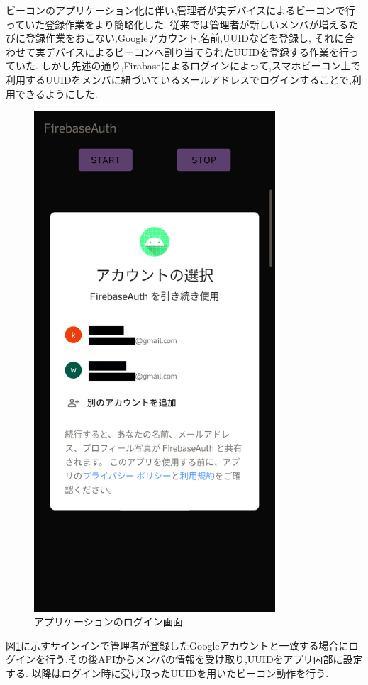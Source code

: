 ビーコンのアプリケーション化に伴い,管理者が実デバイスによるビーコンで行っていた登録作業をより簡略化した.
従来では管理者が新しいメンバが増えるたびに登録作業をおこない,Googleアカウント,名前,UUIDなどを登録し,
それに合わせて実デバイスによるビーコンへ割り当てられたUUIDを登録する作業を行っていた.
しかし先述の通り,Firabaseによるログインによって,スマホビーコン上で利用するUUIDをメンバに紐づいているメールアドレスでログインすることで,利用できるようにした.

\newpage

\begin{figure}[tbh]
  \centering
  \includegraphics[width=9cm]{image/AppSignIn.png}
  \caption{アプリケーションのログイン画面}
  \label{fig:AppSignIn}
\end{figure}


図\ref{fig:AppSignIn}に示すサインインで管理者が登録したGoogleアカウントと一致する場合にログインを行う.その後APIからメンバの情報を受け取り,UUIDをアプリ内部に設定する.
以降はログイン時に受け取ったUUIDを用いたビーコン動作を行う.


